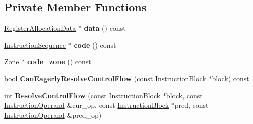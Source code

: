 \subsection*{Private Member Functions}
\begin{DoxyCompactItemize}
\item 
\hyperlink{classv8_1_1internal_1_1compiler_1_1_register_allocation_data}{Register\+Allocation\+Data} $\ast$ {\bfseries data} () const \hypertarget{classv8_1_1internal_1_1compiler_1_1_live_range_connector_ad677a05107c9c57a070b6802812c7ac1}{}\label{classv8_1_1internal_1_1compiler_1_1_live_range_connector_ad677a05107c9c57a070b6802812c7ac1}

\item 
\hyperlink{classv8_1_1internal_1_1compiler_1_1_instruction_sequence}{Instruction\+Sequence} $\ast$ {\bfseries code} () const \hypertarget{classv8_1_1internal_1_1compiler_1_1_live_range_connector_a6ce3622e61029ceb729f303508d189a1}{}\label{classv8_1_1internal_1_1compiler_1_1_live_range_connector_a6ce3622e61029ceb729f303508d189a1}

\item 
\hyperlink{classv8_1_1internal_1_1_zone}{Zone} $\ast$ {\bfseries code\+\_\+zone} () const \hypertarget{classv8_1_1internal_1_1compiler_1_1_live_range_connector_a83f8bddd15b5a97f4475febb08d3ae7c}{}\label{classv8_1_1internal_1_1compiler_1_1_live_range_connector_a83f8bddd15b5a97f4475febb08d3ae7c}

\item 
bool {\bfseries Can\+Eagerly\+Resolve\+Control\+Flow} (const \hyperlink{classv8_1_1internal_1_1compiler_1_1_instruction_block}{Instruction\+Block} $\ast$block) const \hypertarget{classv8_1_1internal_1_1compiler_1_1_live_range_connector_a259634ac89a71198047b38049632af3d}{}\label{classv8_1_1internal_1_1compiler_1_1_live_range_connector_a259634ac89a71198047b38049632af3d}

\item 
int {\bfseries Resolve\+Control\+Flow} (const \hyperlink{classv8_1_1internal_1_1compiler_1_1_instruction_block}{Instruction\+Block} $\ast$block, const \hyperlink{classv8_1_1internal_1_1compiler_1_1_instruction_operand}{Instruction\+Operand} \&cur\+\_\+op, const \hyperlink{classv8_1_1internal_1_1compiler_1_1_instruction_block}{Instruction\+Block} $\ast$pred, const \hyperlink{classv8_1_1internal_1_1compiler_1_1_instruction_operand}{Instruction\+Operand} \&pred\+\_\+op)\hypertarget{classv8_1_1internal_1_1compiler_1_1_live_range_connector_acc9f5b5e8193608eb8b634b8c567f76c}{}\label{classv8_1_1internal_1_1compiler_1_1_live_range_connector_acc9f5b5e8193608eb8b634b8c567f76c}


\end{DoxyCompactItemize}
